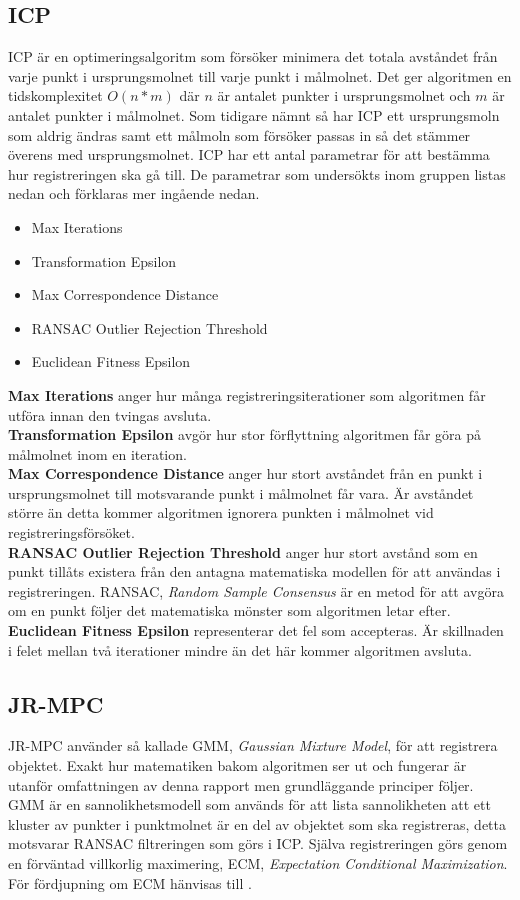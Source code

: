 \subsection{ICP}
ICP är en optimeringsalgoritm som försöker minimera det totala avståndet från varje punkt i ursprungsmolnet till varje punkt i målmolnet. Det ger algoritmen en tidskomplexitet $ \mathit{O(n*m)} $ där $ \mathit{n} $ är antalet punkter i ursprungsmolnet och $ \mathit{m} $ är antalet punkter i målmolnet. Som tidigare nämnt så har ICP ett ursprungsmoln som aldrig ändras samt ett målmoln som försöker passas in så det stämmer överens med ursprungsmolnet. ICP har ett antal parametrar för att bestämma hur registreringen ska gå till. De parametrar som undersökts inom gruppen listas nedan och förklaras mer ingående nedan.
\begin{itemize}
	\item Max Iterations
	\item Transformation Epsilon
	\item Max Correspondence Distance
	\item RANSAC Outlier Rejection Threshold
	\item Euclidean Fitness Epsilon
\end{itemize}
\textbf{Max Iterations} anger hur många registrerings\-iterationer som algoritmen får utföra innan den tvingas avsluta.\\
\textbf{Transformation Epsilon} avgör hur stor förflyttning algoritmen får göra på målmolnet inom en iteration.\\
\textbf{Max Correspondence Distance} anger hur stort avståndet från en punkt i ursprungsmolnet till motsvarande punkt i målmolnet får vara. Är avståndet större än detta kommer algoritmen ignorera punkten i målmolnet vid registreringsförsöket.\\
\textbf{RANSAC Outlier Rejection Threshold} anger hur stort avstånd som en punkt tillåts existera från den antagna matematiska modellen för att användas i registreringen. RANSAC, \textit{Random Sample Consensus} är en metod för att avgöra om en punkt följer det matematiska mönster som algoritmen letar efter.\\
\textbf{Euclidean Fitness Epsilon} representerar det fel som accepteras. Är skillnaden i felet mellan två iterationer mindre än det här kommer algoritmen avsluta.

\subsection{JR-MPC}
JR-MPC använder så kallade GMM, \textit{Gaussian Mixture Model}, för att registrera objektet. Exakt hur matematiken bakom algoritmen ser ut och fungerar är utanför omfattningen av denna rapport men grundläggande principer följer. GMM är en sannolikhetsmodell som används för att lista sannolikheten att ett kluster av punkter i punktmolnet är en del av objektet som ska registreras, detta motsvarar RANSAC filtreringen som görs i ICP. Själva registreringen görs genom en förväntad villkorlig maximering, ECM, \textit{Expectation Conditional Maximization}. För fördjupning om ECM hänvisas till \cite{}.

